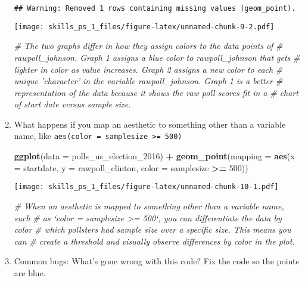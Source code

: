 \documentclass[
]{article}
\newenvironment{Shaded}{\begin{snugshade}}{\end{snugshade}}
\newcommand{\CommentTok}[1]{\textcolor[rgb]{0.56,0.35,0.01}{\textit{#1}}}
\newcommand{\DataTypeTok}[1]{\textcolor[rgb]{0.13,0.29,0.53}{#1}}
\newcommand{\DecValTok}[1]{\textcolor[rgb]{0.00,0.00,0.81}{#1}}
\newcommand{\KeywordTok}[1]{\textcolor[rgb]{0.13,0.29,0.53}{\textbf{#1}}}
\newcommand{\NormalTok}[1]{#1}
\newcommand{\OperatorTok}[1]{\textcolor[rgb]{0.81,0.36,0.00}{\textbf{#1}}}
\newcommand{\StringTok}[1]{\textcolor[rgb]{0.31,0.60,0.02}{#1}}
\begin{document}
\begin{enumerate}
\begin{verbatim}
## Warning: Removed 1 rows containing missing values (geom_point).
\end{verbatim}

  \texttt{[image: skills\_ps\_1\_files/figure-latex/unnamed-chunk-9-2.pdf]}

\begin{Shaded}
\begin{Highlighting}[]
\CommentTok{# The two graphs differ in how they assign colors to the data points of}
\CommentTok{# rawpoll_johnson. Graph 1 assigns a blue color to rawpoll_johnson that gets}
\CommentTok{# lighter in color as value increases. Graph 2 assigns a new color to each }
\CommentTok{# unique 'character' in the variable rawpoll_johnson. Graph 1 is a better}
\CommentTok{# representation of the data because it shows the raw poll scores fit in a }
\CommentTok{# chart of start date versus sample size.}
\end{Highlighting}
\end{Shaded}
\item
  What happens if you map an aesthetic to something other than a
  variable name, like
  \texttt{aes(color\ =\ samplesize\ \textgreater{}=\ 500)}

\begin{Shaded}
\begin{Highlighting}[]
\KeywordTok{ggplot}\NormalTok{(}\DataTypeTok{data =}\NormalTok{ polls_us_election_}\DecValTok{2016}\NormalTok{) }\OperatorTok{+}
\StringTok{  }\KeywordTok{geom_point}\NormalTok{(}\DataTypeTok{mapping =} \KeywordTok{aes}\NormalTok{(}\DataTypeTok{x =}\NormalTok{ startdate, }
                           \DataTypeTok{y =}\NormalTok{ rawpoll_clinton, }
                           \DataTypeTok{color =}\NormalTok{ samplesize }\OperatorTok{>=}\StringTok{ }\DecValTok{500}\NormalTok{))}
\end{Highlighting}
\end{Shaded}

  \texttt{[image: skills\_ps\_1\_files/figure-latex/unnamed-chunk-10-1.pdf]}

\begin{Shaded}
\begin{Highlighting}[]
\CommentTok{# When an aesthetic is mapped to something other than a variable name, such }
\CommentTok{# as `color = samplesize >= 500`, you can differentiate the data by color }
\CommentTok{# which pollsters had sample size over a specific size. This means you can }
\CommentTok{# create a threshold and visually observe differences by color in the plot.}
\end{Highlighting}
\end{Shaded}
\item
  Common bugs: What's gone wrong with this code? Fix the code so the
  points are blue.


\end{enumerate}
\end{document}

